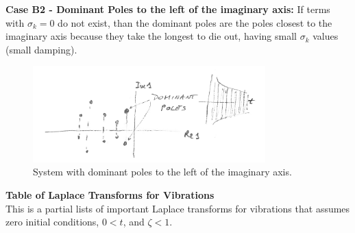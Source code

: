 \documentclass[12pt,letter]{article}
\numberwithin{ex}{section} %
\numberwithin{re}{section} %
\numberwithin{equation}{section}	%
\begin{document}
\noindent \textbf{Case B2 - Dominant Poles to the left of the imaginary axis:} If terms with $\sigma_k=0$ do not exist, than the dominant poles are the poles closest to the imaginary axis because they take the longest to die out, having small $\sigma_k$ values (small damping). 

\begin{figure}[H]
	\centering
	\includegraphics[width=0.8\textwidth]{../figures/dominant_poles_B2.png}
	\caption{System with dominant poles to the left of the imaginary axis.}
\end{figure}







































\pagestyle{empty}
\vspace{-25ex}
\begin{center}
{\large{}\textbf{Table of Laplace Transforms for Vibrations}} \\
\normalsize{} This is a partial lists of important Laplace transforms for vibrations that assumes \\ zero initial conditions, $0 < t$, and $\zeta < 1$.
\end{center}
\end{document}
